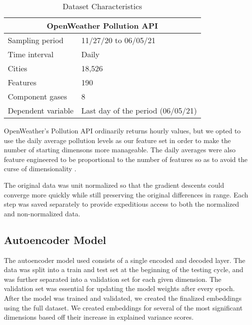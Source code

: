 \documentclass{article}
\begin{document}
\begin{table}[h!]
    \caption{Dataset Characteristics}
    \label{tab:table1}
    \vspace{0.1cm}
    \begin{tabular}{p{4cm}p{7cm}}
        \hline
        \multicolumn{2}{c}{OpenWeather Pollution API} \\
        \hline
        Sampling period  & 11/27/20 to 06/05/21\\
        Time interval & Daily  \\
        Cities & 18,526 \\
        Features & 190 \\
        Component gases & 8 \\
        Dependent variable & Last day of the period (06/05/21) \\
        \hline
    \end{tabular}
\end{table}
\par OpenWeather's Pollution API ordinarily returns hourly values, but we opted to use the daily average pollution levels as our feature set in order to make the number of starting dimensons more manageable. The daily averages were also feature engineered to be proportional to the number of features so as to avoid the curse of dimensionality \parencite{Trunk79}. 
\par The original data was unit normalized so that the gradient descents could converge more quickly while still preserving the original differences in range. Each step was saved separately to provide expeditious access to both the normalized and non-normalized data.

\subsection{Autoencoder Model}
\par The autoencoder model used consists of a single encoded and decoded layer. The data was split into a train and test set at the beginning of the testing cycle, and was further separated into a validation set for each given dimension. The validation set was essential for updating the model weights after every epoch. After the model was trained and validated, we created the finalized embeddings using the full dataset. We created embeddings for several of the most significant dimensions based off their increase in explained variance scores.
\end{document}
